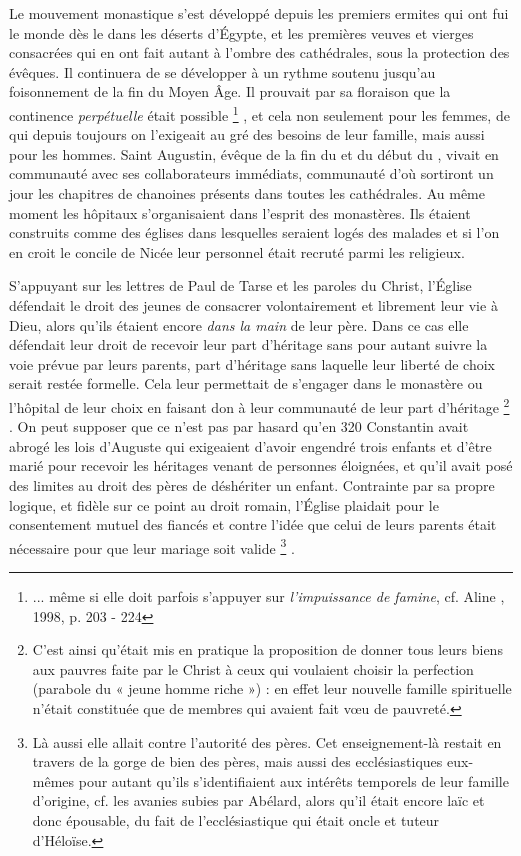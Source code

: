 


 Le mouvement monastique s'est développé depuis les premiers ermites qui ont fui le monde dès le  dans les déserts d'Égypte, et les premières veuves et vierges consacrées qui en ont fait autant à l'ombre des cathédrales, sous la protection des évêques. Il continuera de se développer à un rythme soutenu jusqu'au foisonnement de la fin du Moyen Âge. Il prouvait par sa floraison que la continence \emph{perpétuelle} était possible%
\footnote{... même si elle doit parfois s'appuyer sur \emph{l'impuissance de famine}, cf. Aline , 1998, p. 203 - 224}%
, et cela non seulement pour les femmes, de qui depuis toujours on l'exigeait au gré des besoins de leur famille, mais aussi pour les hommes. Saint Augustin, évêque de la fin du  et du début du , vivait en communauté avec ses collaborateurs immédiats, communauté d'où sortiront un jour les chapitres de chanoines présents dans toutes les cathédrales. Au même moment les hôpitaux s'organisaient dans l'esprit des monastères. Ils étaient construits comme des églises dans lesquelles seraient logés des malades et si l'on en croit le concile de Nicée leur personnel était recruté parmi les religieux.

 S'appuyant sur les lettres de Paul de Tarse et les paroles du Christ, l'Église défendait le droit des jeunes de consacrer volontairement et librement leur vie à Dieu, alors qu'ils étaient encore \emph{dans la main} de leur père. Dans ce cas elle défendait leur droit de recevoir leur part d'héritage sans pour autant suivre la voie prévue par leurs parents, part d'héritage sans laquelle leur liberté de choix serait restée formelle. Cela leur permettait de s'engager dans le monastère ou l'hôpital de leur choix en faisant don à leur communauté de leur part d'héritage%
\footnote{C'est ainsi qu'était mis en pratique la proposition de donner tous leurs biens aux pauvres faite par le Christ à ceux qui voulaient choisir la perfection (parabole du « jeune homme riche ») : en effet leur nouvelle famille spirituelle n'était constituée que de membres qui avaient fait vœu de pauvreté.}%
. On peut supposer que ce n'est pas par hasard qu'en 320 Constantin avait abrogé les lois d'Auguste qui exigeaient d'avoir engendré trois enfants et d'être marié pour recevoir les héritages venant de personnes éloignées, et qu'il avait posé des limites au droit des pères de déshériter un enfant. Contrainte par sa propre logique, et fidèle sur ce point au droit romain, l'Église plaidait pour le consentement mutuel des fiancés et contre l'idée que celui de leurs parents était nécessaire pour que leur mariage soit valide%
\footnote{Là aussi elle allait contre l'autorité des pères. Cet enseignement-là restait en travers de la gorge de bien des pères, mais aussi des ecclésiastiques eux-mêmes pour autant qu'ils s'identifiaient aux intérêts temporels de leur famille d'origine, cf. les avanies subies par Abélard, alors qu'il était encore laïc et donc épousable, du fait de l'ecclésiastique qui était oncle et tuteur d'Héloïse.}%
.


